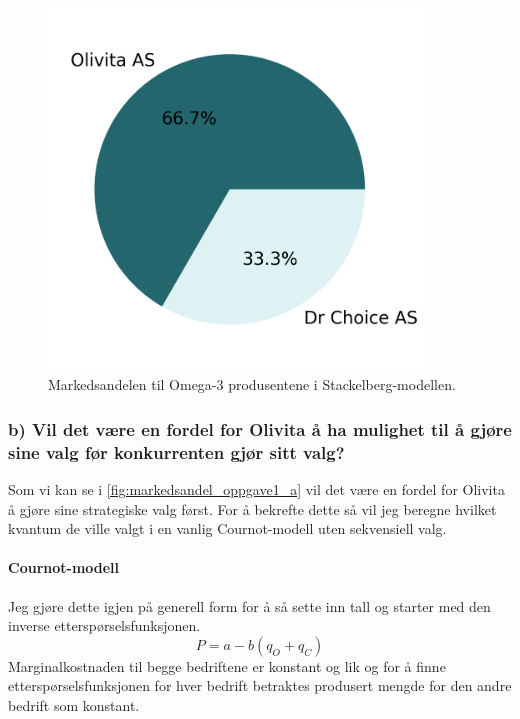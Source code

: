 \documentclass[
  12pt,
  a4paper,
  DIV=11,
  numbers=noendperiod]{scrartcl}
\let\oldparagraph\paragraph
\renewcommand{\paragraph}[1]{\oldparagraph{#1}\mbox{}}
\begin{document}
\begin{figure}[h]
\centering
\includegraphics[width=0.9\textwidth]{dokumentobjekter/figurer/markedsandel_stackelberg.png}
\caption{Markedsandelen til Omega-3 produsentene i Stackelberg-modellen.}
\label{fig:markedsandel_oppgave1_a}
\end{figure}

\newpage

\subsubsection{b) Vil det være en fordel for Olivita å ha mulighet til å
gjøre sine valg før konkurrenten gjør sitt
valg?}\label{b-vil-det-vuxe6re-en-fordel-for-olivita-uxe5-ha-mulighet-til-uxe5-gjuxf8re-sine-valg-fuxf8r-konkurrenten-gjuxf8r-sitt-valg}

Som vi kan se i \autoref{fig:markedsandel_oppgave1_a} vil det være en
fordel for Olivita å gjøre sine strategiske valg først. For å bekrefte
dette så vil jeg beregne hvilket kvantum de ville valgt i en vanlig
Cournot-modell uten sekvensiell valg.

\paragraph{Cournot-modell}\label{cournot-modell}

Jeg gjøre dette igjen på generell form for å så sette inn tall og
starter med den inverse etterspørselsfunksjonen. \[
P = a - b(q_O + q_C)
\] Marginalkostnaden til begge bedriftene er konstant og lik og for å
finne etterspørselsfunksjonen for hver bedrift betraktes produsert
mengde for den andre bedrift som konstant.
\end{document}
